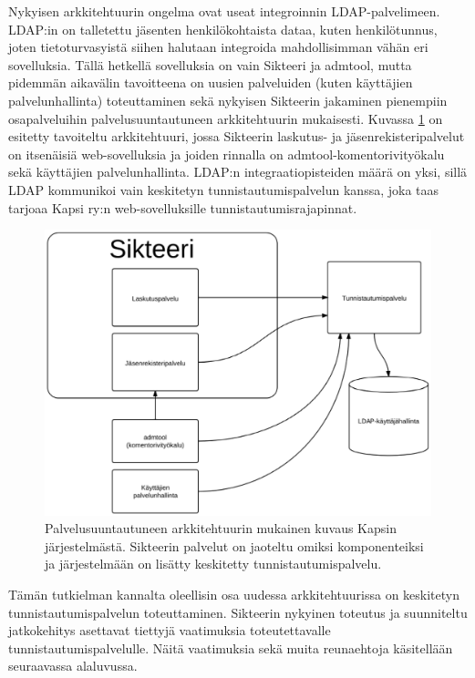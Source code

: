 Nykyisen arkkitehtuurin ongelma ovat useat integroinnin LDAP-palvelimeen. LDAP:in on talletettu jäsenten henkilökohtaista dataa, kuten henkilötunnus, joten tietoturvasyistä siihen halutaan integroida mahdollisimman vähän eri sovelluksia. Tällä hetkellä sovelluksia on vain Sikteeri ja admtool, mutta pidemmän aikavälin tavoitteena on uusien palveluiden (kuten käyttäjien palvelunhallinta) toteuttaminen sekä nykyisen Sikteerin jakaminen pienempiin osapalveluihin palvelusuuntautuneen arkkitehtuurin mukaisesti. Kuvassa \ref{kapsi_uusi} on esitetty tavoiteltu arkkitehtuuri, jossa Sikteerin laskutus- ja jäsenrekisteripalvelut on itsenäisiä web-sovelluksia ja joiden rinnalla on admtool-komentorivityökalu sekä käyttäjien palvelunhallinta. LDAP:n integraatiopisteiden määrä on yksi, sillä LDAP kommunikoi vain keskitetyn tunnistautumispalvelun kanssa, joka taas tarjoaa Kapsi ry:n web-sovelluksille tunnistautumisrajapinnat.

\begin{figure}[ht]
\centering
\includegraphics[width=.7\textwidth]{toteutus/kapsi_uusi.eps}
\caption{Palvelusuuntautuneen arkkitehtuurin mukainen kuvaus Kapsin järjestelmästä. Sikteerin palvelut on jaoteltu omiksi komponenteiksi ja järjestelmään on lisätty keskitetty tunnistautumispalvelu.}%
\label{kapsi_uusi}
\end{figure}

Tämän tutkielman kannalta oleellisin osa uudessa arkkitehtuurissa on keskitetyn tunnistautumispalvelun toteuttaminen. Sikteerin nykyinen toteutus ja suunniteltu jatkokehitys asettavat tiettyjä vaatimuksia toteutettavalle tunnistautumispalvelulle. Näitä vaatimuksia sekä muita reunaehtoja käsitellään seuraavassa alaluvussa.